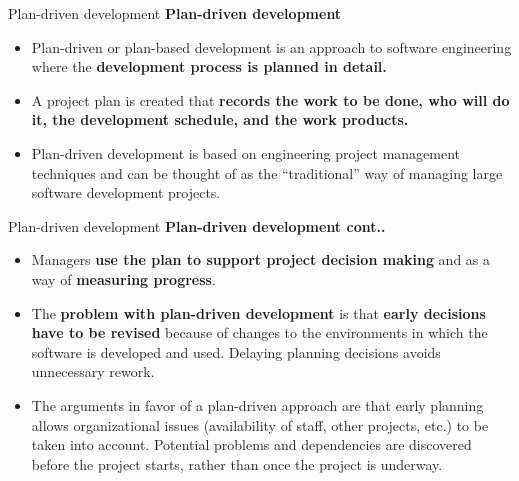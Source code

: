 \documentclass{beamer}
\begin{document}
\begin{frame}{Plan-driven development}
	\textbf{Plan-driven development}
\begin{itemize}
	\item Plan-driven or plan-based development is an approach to software engineering where the 
\textbf{	development process is planned in detail. }
\item A project plan is created that \textbf{records the work to be done, who will do it, the development schedule, 
	and the work products.}
\item Plan-driven development is based on engineering project management techniques and can be thought 
	of as the “traditional” way of managing large software development projects.

\end{itemize}
\end{frame}
\begin{frame}{Plan-driven development}
	\textbf{Plan-driven development cont..}
	\begin{itemize}
		\item Managers \textbf{use the plan to support project decision making} and as a way of \textbf{measuring progress}.
		\item The \textbf{problem with plan-driven development} is that \textbf{early decisions have to be revised} because of 
		changes to the environments in which the software is developed and used. Delaying planning decisions 
		avoids unnecessary rework.
		\item The arguments in favor of a plan-driven approach are that early planning allows organizational issues 
		(availability of staff, other projects, etc.) to be taken into account. Potential problems and 
		dependencies are discovered before the project starts, rather than once the project is underway.
	\end{itemize}
\end{frame}
\end{document}
